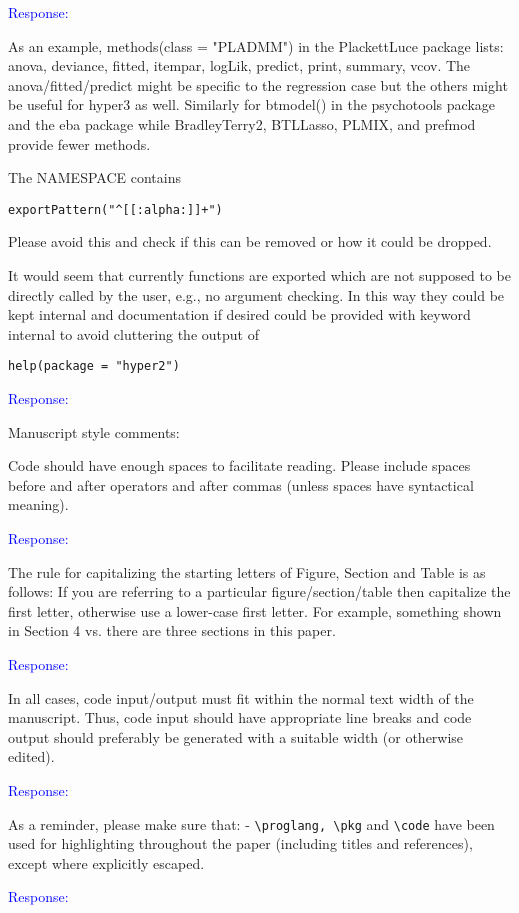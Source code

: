 \documentclass[12pt]{article}
\begin{document}
\textcolor{blue}{Response:}

As an example, methods(class = "PLADMM") in the PlackettLuce package
lists: anova, deviance, fitted, itempar, logLik, predict, print,
summary, vcov. The anova/fitted/predict might be specific to the
regression case but the others might be useful for hyper3 as
well. Similarly for btmodel() in the psychotools package and the eba
package while BradleyTerry2, BTLLasso, PLMIX, and prefmod provide
fewer methods.

The NAMESPACE contains

\verb=exportPattern("^[[:alpha:]]+")=

Please avoid this and check if this can be removed or how it could be
dropped.

It would seem that currently functions are exported which are not
supposed to be directly called by the user, e.g., no argument
checking. In this way they could be kept internal and documentation if
desired could be provided with keyword internal to avoid cluttering
the output of

\verb+help(package = "hyper2")+

\textcolor{blue}{Response:}

Manuscript style comments:

Code should have enough spaces to facilitate reading.  Please include
spaces before and after operators and after commas (unless spaces have
syntactical meaning).

\textcolor{blue}{Response:}

The rule for capitalizing the starting letters of Figure, Section and
Table is as follows: If you are referring to a particular
figure/section/table then capitalize the first letter, otherwise use a
lower-case first letter. For example, something shown in Section 4
vs. there are three sections in this paper.

\textcolor{blue}{Response:}

In all cases, code input/output must fit within the normal text
width of the manuscript.  Thus, code input should have appropriate
line breaks and code output should preferably be generated with a
suitable width (or otherwise edited).

\textcolor{blue}{Response:}

As a reminder, please make sure that: - \verb+\proglang, \pkg+ and
\verb+\code+ have been used for highlighting throughout the paper
(including titles and references), except where explicitly escaped.

\textcolor{blue}{Response:}
\end{document}
